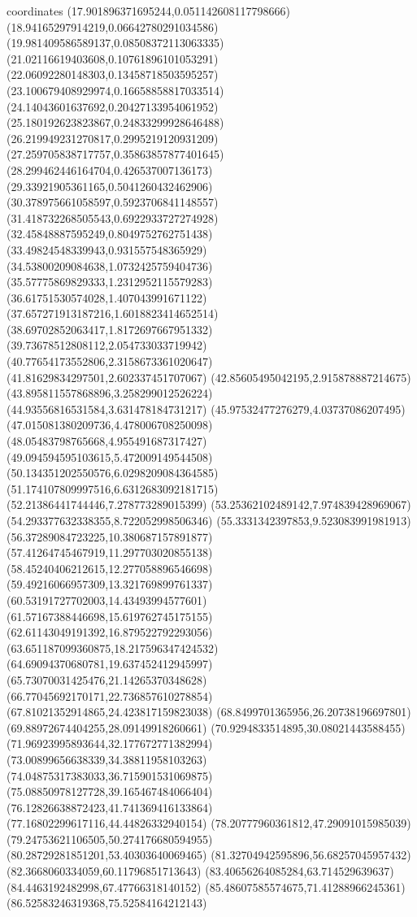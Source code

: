 coordinates {%
(17.901896371695244,0.051142608117798666)
(18.94165297914219,0.06642780291034586)
(19.981409586589137,0.08508372113063335)
(21.02116619403608,0.10761896101053291)
(22.06092280148303,0.13458718503595257)
(23.100679408929974,0.16658858817033514)
(24.14043601637692,0.20427133954061952)
(25.180192623823867,0.24833299928646488)
(26.219949231270817,0.2995219120931209)
(27.259705838717757,0.35863857877401645)
(28.299462446164704,0.426537007136173)
(29.33921905361165,0.5041260432462906)
(30.378975661058597,0.5923706841148557)
(31.418732268505543,0.6922933727274928)
(32.45848887595249,0.8049752762751438)
(33.49824548339943,0.931557548365929)
(34.53800209084638,1.0732425759404736)
(35.57775869829333,1.2312952115579283)
(36.61751530574028,1.407043991671122)
(37.657271913187216,1.6018823414652514)
(38.69702852063417,1.8172697667951332)
(39.73678512808112,2.054733033719942)
(40.77654173552806,2.3158673361020647)
(41.81629834297501,2.602337451707067)
(42.85605495042195,2.915878887214675)
(43.895811557868896,3.258299012526224)
(44.93556816531584,3.631478184731217)
(45.97532477276279,4.03737086207495)
(47.015081380209736,4.478006708250098)
(48.05483798765668,4.955491687317427)
(49.094594595103615,5.472009149544508)
(50.134351202550576,6.0298209084364585)
(51.174107809997516,6.6312683092181715)
(52.21386441744446,7.278773289015399)
(53.25362102489142,7.974839428969067)
(54.293377632338355,8.722052998506346)
(55.3331342397853,9.523083991981913)
(56.37289084723225,10.380687157891877)
(57.41264745467919,11.297703020855138)
(58.45240406212615,12.277058896546698)
(59.49216066957309,13.321769899761337)
(60.53191727702003,14.43493994577601)
(61.57167388446698,15.619762745175155)
(62.61143049191392,16.879522792293056)
(63.651187099360875,18.217596347424532)
(64.69094370680781,19.637452412945997)
(65.73070031425476,21.14265370348628)
(66.77045692170171,22.736857610278854)
(67.81021352914865,24.423817159823038)
(68.8499701365956,26.20738196697801)
(69.88972674404255,28.09149918260661)
(70.9294833514895,30.08021443588455)
(71.96923995893644,32.177672771382994)
(73.00899656638339,34.38811958103263)
(74.04875317383033,36.715901531069875)
(75.08850978127728,39.165467484066404)
(76.12826638872423,41.741369416133864)
(77.16802299617116,44.44826332940154)
(78.20777960361812,47.29091015985039)
(79.24753621106505,50.274176680594955)
(80.28729281851201,53.40303640069465)
(81.32704942595896,56.68257045957432)
(82.3668060334059,60.11796851713643)
(83.40656264085284,63.714529639637)
(84.4463192482998,67.47766318140152)
(85.48607585574675,71.41288966245361)
(86.52583246319368,75.52584164212143)
}
